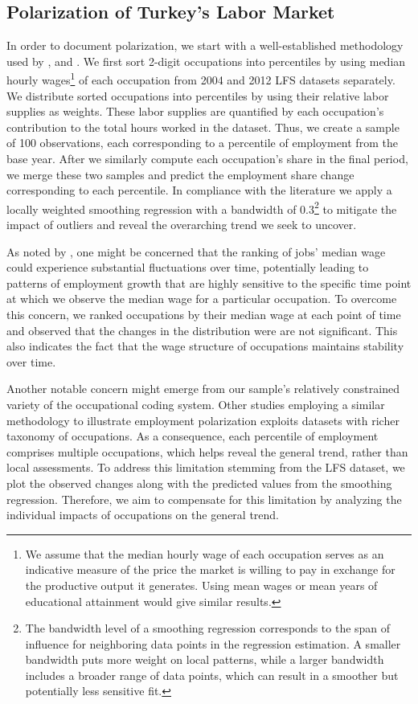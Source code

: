 \subsection{Polarization of Turkey's Labor Market}

\begin{onehalfspace}
In order to document polarization, we start with a well-established
methodology used by \citet{2006Autor,Acemoglu2011,2007Goos}, and
\citet{2013Autor}. We first sort 2-digit occupations into percentiles
by using median hourly wages\footnote{We assume that the median hourly wage of each occupation serves as
an indicative measure of the price the market is willing to pay in
exchange for the productive output it generates. Using mean wages
or mean years of educational attainment would give similar results.} of each occupation from 2004 and 2012 LFS datasets separately. We
distribute sorted occupations into percentiles by using their relative
labor supplies as weights. These labor supplies are quantified by
each occupation's contribution to the total hours worked in the dataset.
Thus, we create a sample of 100 observations, each corresponding to
a percentile of employment from the base year. After we similarly
compute each occupation's share in the final period, we merge these
two samples and predict the employment share change corresponding
to each percentile. In compliance with the literature we apply a locally
weighted smoothing regression with a bandwidth of 0.3\footnote{The bandwidth level of a smoothing regression corresponds to the span
of influence for neighboring data points in the regression estimation.
A smaller bandwidth puts more weight on local patterns, while a larger
bandwidth includes a broader range of data points, which can result
in a smoother but potentially less sensitive fit.} to mitigate the impact of outliers and reveal the overarching trend
we seek to uncover.

As noted by \citet{2007Goos}, one might be concerned that the ranking
of jobs' median wage could experience substantial fluctuations over
time, potentially leading to patterns of employment growth that are
highly sensitive to the specific time point at which we observe the
median wage for a particular occupation. To overcome this concern,
we ranked occupations by their median wage at each point of time and
observed that the changes in the distribution were are not significant.
This also indicates the fact that the wage structure of occupations
maintains stability over time.

Another notable concern might emerge from our sample's relatively
constrained variety of the occupational coding system. Other studies
employing a similar methodology to illustrate employment polarization
\citep{2007Goos,2006Autor,Acemoglu2011} exploits datasets with richer
taxonomy of occupations. As a consequence, each percentile of employment
comprises multiple occupations, which helps reveal the general trend,
rather than local assessments. To address this limitation stemming
from the LFS dataset, we plot the observed changes along with the
predicted values from the smoothing regression. Therefore, we aim
to compensate for this limitation by analyzing the individual impacts
of occupations on the general trend.


\end{onehalfspace}
